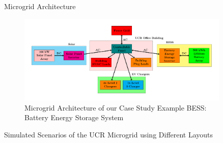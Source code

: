 \documentclass[final, 36 pt]{beamer}
\newlength{\sepwid}
\newlength{\onecolwid}
\newlength{\twocolwid}
\begin{document}
\begin{frame}[t]
\begin{columns}[t]
\begin{column}{\onecolwid}

\end{column} %

\begin{column}{\sepwid}\end{column} %

\begin{column}{\twocolwid} %


\begin{block}{Microgrid Architecture}
	\begin{figure}[!htb] 		
		\includegraphics[width=\linewidth]{Fig/power_system_setup_modelica_large}
		\caption{Microgrid Architecture of our Case Study Example BESS: Battery Energy Storage System}
		\label{fig:powersystemsetupfull}
	\end{figure}
\end{block}

\begin{block}{Simulated Scenarios of the UCR Microgrid using Different Layouts}
	
	\begin{table}
		\caption{}
		\centering
		
		\label{tab:scenarios}
	\end{table}
	
\end{block}


\end{column}
\end{columns}
\end{frame}
\end{document}
